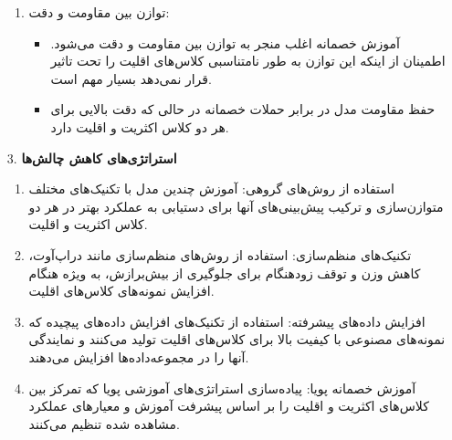 \begin{qsolve}
\begin{enumerate}
\begin{enumerate}
			
			\item توازن بین مقاومت و دقت:
			\begin{itemize}
				\item 
آموزش خصمانه اغلب منجر به توازن بین مقاومت و دقت می‌شود. اطمینان از اینکه این توازن به طور نامتناسبی کلاس‌های اقلیت را تحت تاثیر قرار نمی‌دهد بسیار مهم است.


				\item 
حفظ مقاومت مدل در برابر حملات خصمانه در حالی که دقت بالایی برای هر دو کلاس اکثریت و اقلیت دارد.
			\end{itemize}
		\end{enumerate}
		
		
		
		\item [3.]\textbf{استراتژی‌های کاهش چالش‌ها}
		\begin{enumerate}
			\item استفاده از روش‌های گروهی:
آموزش چندین مدل با تکنیک‌های مختلف متوازن‌سازی و ترکیب پیش‌بینی‌های آنها برای دستیابی به عملکرد بهتر در هر دو کلاس اکثریت و اقلیت.
			
			
			\item تکنیک‌های منظم‌سازی:
استفاده از روش‌های منظم‌سازی مانند دراپ‌آوت، کاهش وزن و توقف زودهنگام برای جلوگیری از بیش‌برازش، به ویژه هنگام افزایش نمونه‌های کلاس‌های اقلیت.
			
			
			\item افزایش داده‌های پیشرفته:
استفاده از تکنیک‌های افزایش داده‌های پیچیده که نمونه‌های مصنوعی با کیفیت بالا برای کلاس‌های اقلیت تولید می‌کنند و نمایندگی آنها را در مجموعه‌داده‌ها افزایش می‌دهند.
			
			
			\item آموزش خصمانه پویا:
پیاده‌سازی استراتژی‌های آموزشی پویا که تمرکز بین کلاس‌های اکثریت و اقلیت را بر اساس پیشرفت آموزش و معیارهای عملکرد مشاهده شده تنظیم می‌کنند.
		\end{enumerate}
	\end{enumerate}
\end{qsolve}